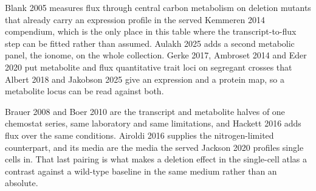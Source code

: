  Blank 2005 measures flux
through central carbon metabolism on deletion mutants that already carry an expression
profile in the served Kemmeren 2014 compendium, which is the only place in this table
where the transcript-to-flux step can be fitted rather than assumed. Aulakh 2025 adds a
second metabolic panel, the ionome, on the whole collection. Gerke 2017, Ambroset 2014
and Eder 2020 put metabolite and flux quantitative trait loci on segregant crosses that
Albert 2018 and Jakobson 2025 give an expression and a protein map, so a metabolite locus
can be read against both.

 Brauer 2008 and Boer 2010 are
the transcript and metabolite halves of one chemostat series, same laboratory and same
limitations, and Hackett 2016 adds flux over the same conditions. Airoldi 2016 supplies the
nitrogen-limited counterpart, and its media are the media the served Jackson 2020 profiles
single cells in. That last pairing is what makes a deletion effect in the single-cell atlas
a contrast against a wild-type baseline in the same medium rather than an absolute.


